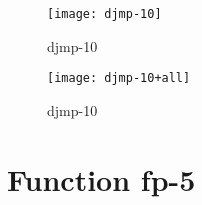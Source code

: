 \begin{center}
\begin{figure}[h]
\centering
\texttt{[image: djmp-10]}
\caption{djmp-10}
\end{figure}
\end{center}

\begin{center}
\begin{figure}[h]
\centering
\texttt{[image: djmp-10+all]}
\caption{djmp-10}
\end{figure}
\end{center}

\newpage

\section{Function fp-5}

